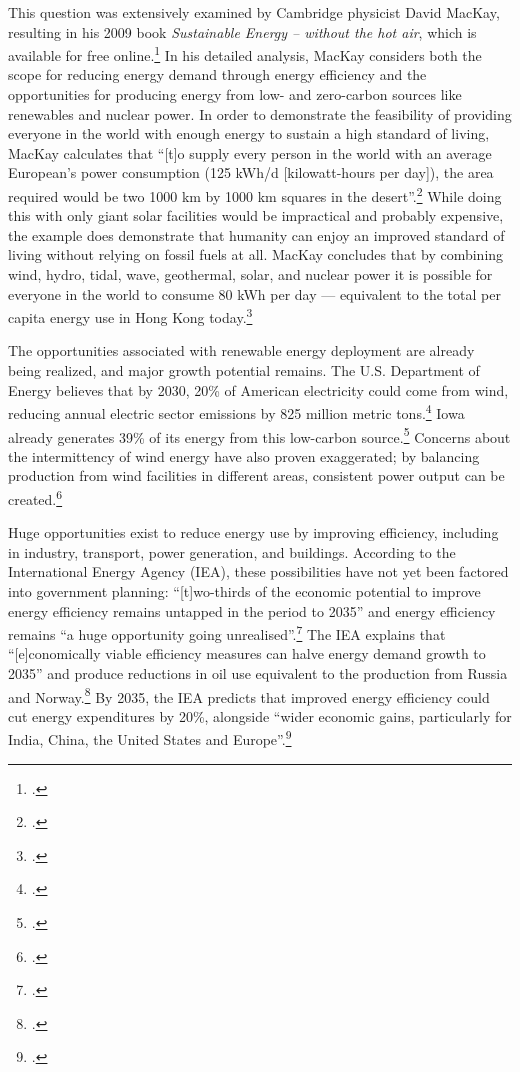 This question was extensively examined by Cambridge physicist David MacKay, resulting in his 2009 book \emph{Sustainable Energy – without the hot air}, which is available for free online.\footcite[][]{MacKay2009}
In his detailed analysis, MacKay considers both the scope for reducing energy demand through energy efficiency and the opportunities for producing energy from low- and zero-carbon sources like renewables and nuclear power.
In order to demonstrate the feasibility of providing everyone in the world with enough energy to sustain a high standard of living, MacKay calculates that ``[t]o supply every person in the world with an average European's power consumption (125 kWh/d [kilowatt-hours per day]), the area required would be two 1000 km by 1000 km squares in the desert''.\footcite[][p. 178]{MacKay2009}
While doing this with only giant solar facilities would be impractical and probably expensive, the example does demonstrate that humanity can enjoy an improved standard of living without relying on fossil fuels at all.
MacKay concludes that by combining wind, hydro, tidal, wave, geothermal, solar, and nuclear power it is possible for everyone in the world to consume 80 kWh per day --- equivalent to the total per capita energy use in Hong Kong today.\footcite[][p. 106, 238]{MacKay2009}



The opportunities associated with renewable energy deployment are already being realized, and major growth potential remains.
The U.S. Department of Energy believes that by 2030, 20\% of American electricity could come from wind, reducing annual electric sector  emissions by 825 million metric tons.\footcite[][]{20PercentBy2030}
Iowa already generates 39\% of its energy from this low-carbon source.\footcite[][]{BlownAway}
Concerns about the intermittency of wind energy have also proven exaggerated; by balancing production from wind facilities in different areas, consistent power output can be created.\footcite[][]{BlownAway}



Huge opportunities exist to reduce energy use by improving efficiency, including in industry, transport, power generation, and buildings.
According to the International Energy Agency (IEA), these possibilities have not yet been factored into government planning: ``[t]wo-thirds of the economic potential to improve energy efficiency remains untapped in the period to 2035'' and energy efficiency remains ``a huge opportunity going unrealised''.\footcite[][p. 13]{IEA2012press}
The IEA explains that ``[e]conomically viable efficiency measures can halve energy demand growth to 2035'' and produce reductions in oil use equivalent to the production from Russia and Norway.\footcite[][p. 14]{IEA2012press}
By 2035, the IEA predicts that improved energy efficiency could cut energy expenditures by 20\%, alongside ``wider economic gains, particularly for India, China, the United States and Europe''.\footcite[][p. 15]{IEA2012press}



